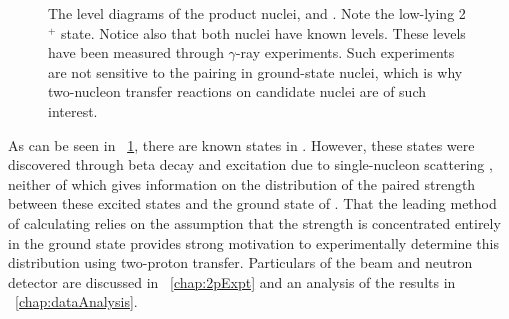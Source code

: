 \begin{figure}[!htbp]
\captionsetup[subfloat]{labelformat=empty}
\centering
{}
\hspace{2cm}
\caption{The level diagrams of the product nuclei,  and .  Note the low-lying 2$^+$ state.  Notice also that both nuclei have known \zp levels.  These levels have been measured through $\gamma$-ray experiments.  Such experiments are not sensitive to the pairing in ground-state nuclei, which is why two-nucleon transfer reactions on \zvbb candidate nuclei are of such interest.}
\label{fig:levelDiagrams}
\end{figure}
As can be seen in {\fig}~\ref{fig:levelDiagrams}, there are known \zp states in \SeProducts.  However, these states were discovered through beta decay and excitation due to single-nucleon scattering \citep{NNDC}, neither of which gives information on the distribution of the paired \zp strength between these excited states and the ground state of \GeTargets.  That the leading method of calculating \NME relies on the assumption that the \zp strength is concentrated entirely in the ground state provides strong motivation to experimentally determine this distribution using two-proton transfer.  Particulars of the beam and neutron detector are discussed in {\chap}~\ref{chap:2pExpt} and an analysis of the results in {\chap}~\ref{chap:dataAnalysis}.
%
% 
% 
